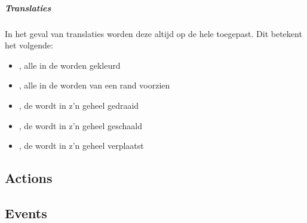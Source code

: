 \subparagraph{Translaties}
In het geval van translaties worden deze altijd op de hele  toegepast. Dit betekent het volgende:
\begin{itemize}
	\item {}, alle \shapes in de  worden gekleurd
	\item {}, alle \shapes in de  worden van een rand voorzien
	\item {}, de  wordt in z'n geheel gedraaid
	\item {}, de  wordt in z'n geheel geschaald
	\item {}, de  wordt in z'n geheel verplaatst
\end{itemize}

\subsection{Actions}

\subsection{Events}
